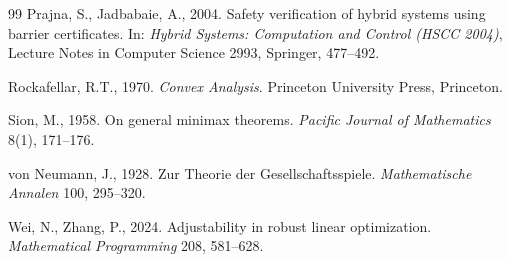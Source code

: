 \begin{thebibliography}{99}
 Prajna, S., Jadbabaie, A., 2004. Safety verification of hybrid systems using barrier certificates. In: \emph{Hybrid Systems: Computation and Control (HSCC 2004)}, Lecture Notes in Computer Science 2993, Springer, 477--492.

 Rockafellar, R.T., 1970. \emph{Convex Analysis}. Princeton University Press, Princeton.

 Sion, M., 1958. On general minimax theorems. \emph{Pacific Journal of Mathematics} 8(1), 171--176.

 von Neumann, J., 1928. Zur Theorie der Gesellschaftsspiele. \emph{Mathematische Annalen} 100, 295--320.

 Wei, N., Zhang, P., 2024. Adjustability in robust linear optimization. \emph{Mathematical Programming} 208, 581--628.

\end{thebibliography}



